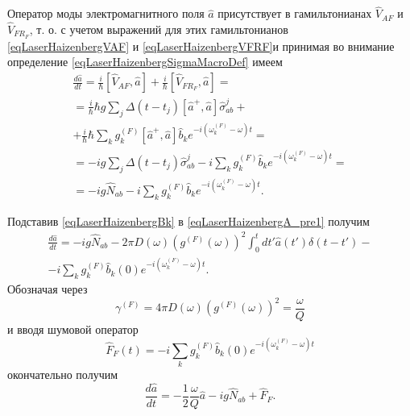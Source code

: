 Оператор моды электромагнитного поля $\hat{a}$ присутствует в
гамильтонианах $\hat{V}_{AF}$ и $\hat{V}_{FR_F}$, т. о.  с учетом
выражений для этих гамильтонианов \eqref{eqLaserHaizenbergVAF} и 
\eqref{eqLaserHaizenbergVFRF}и принимая во внимание определение
\eqref{eqLaserHaizenbergSigmaMacroDef} имеем 
\begin{eqnarray}
\frac{d \hat{a}}{d t} = \frac{i}{\hbar}
\left[\hat{V}_{AF}, \hat{a}\right] + 
\frac{i}{\hbar}
\left[\hat{V}_{FR_F}, \hat{a}\right] = 
\nonumber \\
= \frac{i}{\hbar}\hbar g
\sum_j
\Delta\left(t - t_j\right) 
\left[\hat{a}^{+},\hat{a}\right]\hat{\sigma}^{j}_{ab} +
\nonumber \\
+ 
\frac{i}{\hbar}\hbar
\sum_k
g_k^{(F)}
\left[\hat{a}^{+},\hat{a}\right]\hat{b}_k e^{-i\left(\omega_k^{(F)} -
  \omega\right)t} = 
\nonumber \\
= -i g 
\sum_j
\Delta\left(t - t_j\right) \hat{\sigma}^{j}_{ab} -
i \sum_k
g_k^{(F)}\hat{b}_k e^{-i\left(\omega_k^{(F)} -
  \omega\right)t} =
\nonumber \\ 
= -i g \hat{N}_{ab} -
i \sum_k
g_k^{(F)}\hat{b}_k e^{-i\left(\omega_k^{(F)} -
  \omega\right)t}.
\label{eqLaserHaizenbergA_pre1}
\end{eqnarray}

Подставив \eqref{eqLaserHaizenbergBk} в
\eqref{eqLaserHaizenbergA_pre1} получим
\begin{eqnarray}
\frac{d \hat{a}}{d t} = 
-i g \hat{N}_{ab}
- 2 \pi
D\left(\omega\right) \left(g^{(F)}\left(\omega\right)\right)^2
\int_0^td t' \hat{a}\left(t'\right)\delta\left(t - t'\right) - 
\nonumber \\
-
i
\sum_k
g_k^{(F)}\hat{b}_k \left(0\right)e^{-i\left(\omega_k^{(F)} -
  \omega\right)t}.
\nonumber
\end{eqnarray}
Обозначая через 
\[
\gamma^{(F)} = 4 \pi
D\left(\omega\right) \left(g^{(F)}\left(\omega\right)\right)^2 = \frac{\omega}{Q}
\]
и вводя шумовой оператор
\begin{equation}
\hat{F}_F\left(t\right) = - i
\sum_k
g_k^{(F)}\hat{b}_k \left(0\right)e^{-i\left(\omega_k^{(F)} -
  \omega\right)t}
\label{eqLaserHaizenbergFF}
\end{equation}
окончательно получим
\begin{equation}
\frac{d \hat{a}}{d t} = 
- \frac{1}{2}\frac{\omega}{Q}\hat{a}
-i g \hat{N}_{ab} + 
\hat{F}_F.
\label{eqLaserHaizenbergA}
\end{equation}

